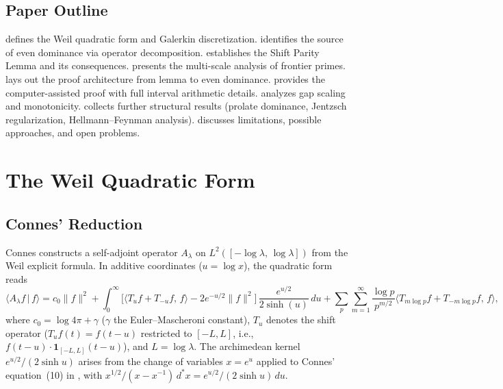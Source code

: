 \documentclass[12pt,a4paper]{article}
\theoremstyle{definition}
\theoremstyle{remark}
\begin{document}
\subsection{Paper Outline}

 defines the Weil quadratic form and Galerkin discretization.  identifies the source of even dominance via operator decomposition.  establishes the Shift Parity Lemma and its consequences.  presents the multi-scale analysis of frontier primes.  lays out the proof architecture from lemma to even dominance.  provides the computer-assisted proof with full interval arithmetic details.  analyzes gap scaling and monotonicity.  collects further structural results (prolate dominance, Jentzsch regularization, Hellmann--Feynman analysis).  discusses limitations, possible approaches, and open problems.


\section{The Weil Quadratic Form}
\label{sec:weil}

\subsection{Connes' Reduction}

Connes constructs a self-adjoint operator $A_\lambda$ on $L^2([-\log\lambda,\,\log\lambda])$ from the Weil explicit formula. In additive coordinates ($u = \log x$), the quadratic form reads
\begin{equation}
\label{eq:QW}
  \langle A_\lambda f \,|\, f \rangle = c_0 \|f\|^2
  + \int_0^\infty \Big[\langle T_u f + T_{-u} f,\, f \rangle - 2e^{-u/2}\|f\|^2\Big]\,\frac{e^{u/2}}{2\sinh(u)}\,du
  + \sum_p \sum_{m=1}^\infty \frac{\log p}{p^{m/2}} \langle T_{m\log p} f + T_{-m\log p} f,\, f \rangle,
\end{equation}
where $c_0 = \log 4\pi + \gamma$ ($\gamma$ the Euler--Mascheroni constant), $T_u$ denotes the shift operator ($T_u f(t) = f(t-u)$ restricted to $[-L,L]$, i.e., $f(t-u)\cdot\mathbf{1}_{[-L,L]}(t-u)$), and $L = \log\lambda$. The archimedean kernel $e^{u/2}/(2\sinh u)$ arises from the change of variables $x = e^u$ applied to Connes' equation~(10) in \cite{Connes2025}, with $x^{1/2}/(x-x^{-1})\,d^*\!x = e^{u/2}/(2\sinh u)\,du$.
\end{document}
